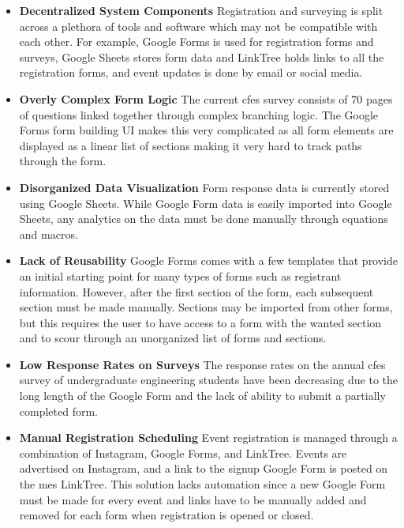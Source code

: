 \documentclass[12pt]{article}
\begin{document}
\begin{itemize}
  \item \textbf{Decentralized System Components} Registration and surveying is split across a plethora of tools and
    software which may not be compatible with each other. For example, Google Forms is used for registration forms and
    surveys, Google Sheets stores form data and LinkTree holds links to all the registration forms, and event updates is
    done by email or social media.
  \item \textbf{Overly Complex Form Logic} The current \gls{cfes} survey consists of 70 pages of questions linked
    together through complex branching logic. The Google Forms form building UI makes this very complicated as all form
    elements are displayed as a linear list of sections making it very hard to track paths through the form.
  \item \textbf{Disorganized Data Visualization} Form response data is currently stored using Google Sheets. While
    Google Form data is easily imported into Google Sheets, any analytics on the data must be done manually through
    equations and macros.
  \item \textbf{Lack of Reusability} Google Forms comes with a few templates that provide an initial starting point for
    many types of forms such as registrant information. However, after the first section of the form, each subsequent
    section must be made manually. Sections may be imported from other forms, but this requires the user to have access
    to a form with the wanted section and to scour through an unorganized list of forms and sections.
  \item \textbf{Low Response Rates on Surveys} The response rates on the annual \gls{cfes} survey of undergraduate engineering
    students have been decreasing due to the long length of the Google Form and the lack of ability to submit a
    partially completed form.
  \item \textbf{Manual Registration Scheduling} Event registration is managed through a combination of Instagram, Google
    Forms, and LinkTree. Events are advertised on Instagram, and a link to the signup Google Form is posted on the
    \gls{mes} LinkTree. This solution lacks automation since a new Google Form must be made for every event and links
    have to be manually added and removed for each form when registration is opened or closed.
\end{itemize}

%
\end{document}
